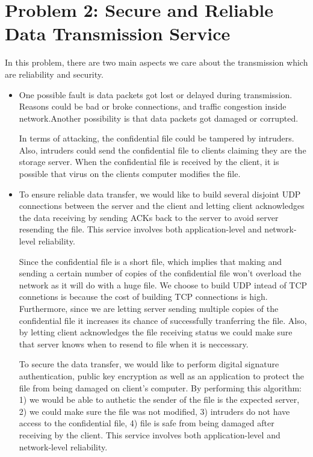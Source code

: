 \section{Problem 2: Secure and Reliable Data Transmission Service}

In this problem, there are two main aspects we care about the transmission which are
reliability and security.

\begin{itemize}

\item One possible fault is data packets got lost or delayed during transmission. Reasons could be bad or broke connections, and traffic congestion inside network.Another possibility is that data packets got damaged or corrupted.

In terms of attacking, the confidential file could be tampered by intruders. Also, intruders could send the confidential file to clients claiming they are the storage server. When the confidential file is received by the client, it is possible that virus on the clients computer modifies the file.

\item To ensure reliable data transfer, we would like to build several disjoint UDP connections between the server and the client and letting client acknowledges the data receiving by sending ACKs back to the server to avoid server resending the file. This service involves both application-level and network-level reliability.

Since the confidential file is a short file, which implies that making and sending a certain number of copies of the confidential file won't overload the network as it will do with a huge file. We choose to build UDP intead of TCP connetions is because the cost of building TCP connections is high. Furthermore, since we are letting server sending multiple copies of the confidential file it increases its chance of successfully tranferring the file. Also, by letting client acknowledges the file receiving status we could make sure that server knows when to resend to file when it is neccessary.

To secure the data transfer, we would like to perform digital signature authentication, public key encryption as well as an application to protect the file from being damaged on client's computer. By performing this algorithm: 1) we would be able to authetic the sender of the file is the expected server, 2) we could make sure the file was not modified, 3) intruders do not have access to the confidential file, 4) file is safe from being damaged after receiving by the client. This service involves both application-level and network-level reliability.


\end{itemize}
